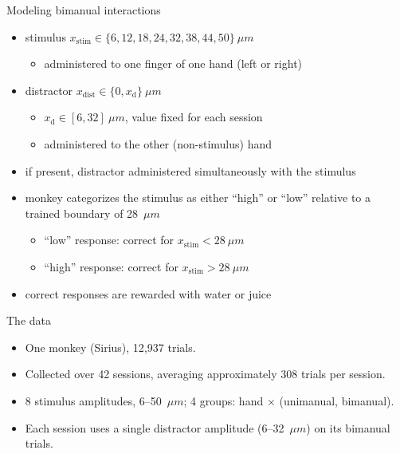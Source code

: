\begin{frame}{Modeling bimanual interactions}
  \begin{itemize}
    \item \textcolor{muted!60}{stimulus $x_\text{stim} \in \{6, 12, 18, 24, 32, 38, 44, 50 \}~\mu m$}
    \begin{itemize}
      \item \textcolor{muted!60}{administered to one finger of one hand (left or right)}
    \end{itemize}
    \item \textcolor{plotblue}{distractor $x_\text{dist} \in \{0, x_\text{d}\}~\mu m$}
    \begin{itemize}
      \item \textcolor{plotblue}{$x_\text{d} \in [6, 32]~\mu m$, value fixed for each session}
      \item \textcolor{plotblue}{administered to the other (non-stimulus) hand}
    \end{itemize}
    \item \textcolor{plotblue}{if present, distractor administered simultaneously with the stimulus}
    \item \textcolor{muted!60}{monkey categorizes the stimulus as either
          ``high'' or ``low'' relative to a trained boundary of 28~$\mu m$}
    \begin{itemize}
      \item \textcolor{muted!60}{``low'' response: correct for $x_\text{stim} < 28~\mu m$}
      \item \textcolor{muted!60}{``high'' response: correct for $x_\text{stim} > 28~\mu m$}
    \end{itemize}
    \item \textcolor{muted!60}{correct responses are rewarded with water or juice}
  \end{itemize}
\end{frame}

\begin{frame}{The data}
  \begin{itemize}
    \item One monkey (Sirius), 12{,}937 trials.
    \item Collected over 42 sessions, averaging approximately 308 trials per session.
    \item 8 stimulus amplitudes, 6--50~$\mu m$; 4 groups: hand $\times$
          (unimanual, bimanual).
    \item Each session uses a single distractor amplitude (6--32~$\mu m$) on its
          bimanual trials.
  \end{itemize}
  \vfill
  \centering\footnotesize
  
  \vfill
\end{frame}

